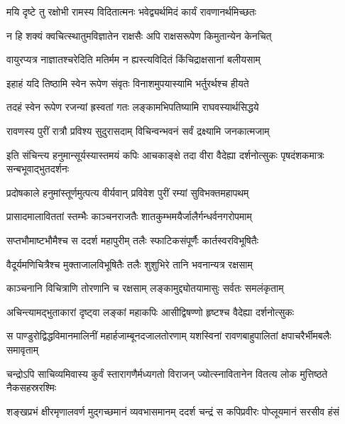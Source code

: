 \twolineshloka
{मयि दृष्टे तु रक्षोभी रामस्य विदितात्मनः}
{भवेद्व्यर्थमिदं कार्यं रावणानर्थमिच्छतः} %

\twolineshloka
{न हि शक्यं क्वचित्स्थातुमविज्ञातेन राक्षसैः}
{अपि राक्षसरूपेण किमुतान्येन केनचित्} %

\twolineshloka
{वायुरप्यत्र नाज्ञातश्चरेदिति मतिर्मम}
{न ह्यस्त्यविदितं किंचिद्राक्षसानां बलीयसाम्} %

\twolineshloka
{इहाहं यदि तिष्ठामि स्वेन रूपेण संवृतः}
{विनाशमुपयास्यामि भर्तुरर्थश्च हीयते} %

\twolineshloka
{तदहं स्वेन रूपेण रजन्यां ह्रस्वतां गतः}
{लङ्कामभिपतिष्यामि राघवस्यार्थसिद्धये} %

\twolineshloka
{रावणस्य पुरीं रात्रौ प्रविश्य सुदुरासदाम्}
{विचिन्वन्भवनं सर्वं द्रक्ष्यामि जनकात्मजाम्} %

\threelineshloka
{इति संचिन्त्य हनुमान्सूर्यस्यास्तमयं कपिः}
{आचकाङ्क्षे तदा वीरा वैदेह्या दर्शनोत्सुकः}
{पृषदंशकमात्रः सन्बभूवाद्भुतदर्शनः} %

\twolineshloka
{प्रदोषकाले हनुमांस्तूर्णमुत्पत्य वीर्यवान्}
{प्रविवेश पुरीं रम्यां सुविभक्तमहापथम्} %

\twolineshloka
{प्रासादमालाविततां स्तम्भैः काञ्चनराजतैः}
{शातकुम्भमयैर्जालैर्गन्धर्वनगरोपमाम्} %

\twolineshloka
{सप्तभौमाष्टभौमैश्च स ददर्श महापुरीम्}
{तलैः स्फाटिकसंपूर्णैः कार्तस्वरविभूषितैः} %

\twolineshloka
{वैदूर्यमणिचित्रैश्च मुक्ताजालविभूषितैः}
{तलैः शुशुभिरे तानि भवनान्यत्र रक्षसाम्} %

\twolineshloka
{काञ्चनानि विचित्राणि तोरणानि च रक्षसाम्}
{लङ्कामुद्द्योतयामासुः सर्वतः समलंकृताम्} %

\twolineshloka
{अचिन्त्यामद्भुताकारां दृष्ट्वा लङ्कां महाकपिः}
{आसीद्विषण्णो हृष्टश्च वैदेह्या दर्शनोत्सुकः} %

\fourlineindentedshloka
{स पाण्डुरोद्विद्धविमानमालिनीं}
{ महार्हजाम्बूनदजालतोरणाम्}
{यशस्विनां रावणबाहुपालितां}
{ क्षपाचरैर्भीमबलैः समावृताम्} %

\fourlineindentedshloka
{चन्द्रोऽपि साचिव्यमिवास्य कुर्वं}
{स्तारागणैर्मध्यगतो विराजन्}
{ज्योत्स्नावितानेन वितत्य लोक}
{मुत्तिष्ठते नैकसहस्ररश्मिः} %

\fourlineindentedshloka
{शङ्खप्रभं क्षीरमृणालवर्ण}
{मुद्गच्छमानं व्यवभासमानम्}
{ददर्श चन्द्रं स कपिप्रवीरः}
{ पोप्लूयमानं सरसीव हंसं} %


